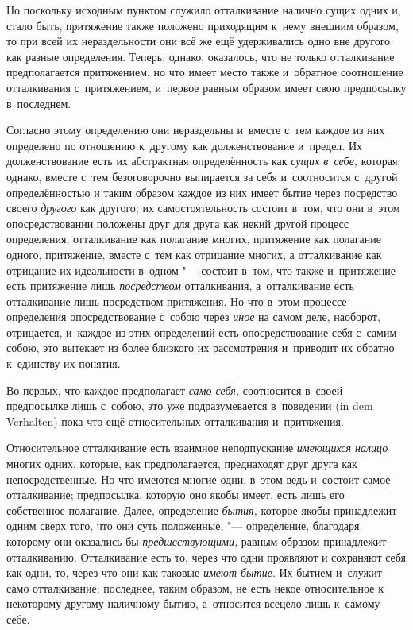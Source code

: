Но поскольку исходным пунктом служило отталкивание налично сущих одних и,
стало быть, притяжение также положено приходящим к~нему внешним образом, то
при всей их нераздельности они всё же ещё удерживались одно вне другого как
разные определения. Теперь, однако, оказалось, что не только отталкивание
предполагается притяжением, но что имеет место также и~обратное соотношение
отталкивания с~притяжением, и~первое равным образом имеет свою предпосылку
в~последнем.

Согласно этому определению они нераздельны и~вместе с~тем каждое из них
определено по отношению к~другому как долженствование и~предел. Их
долженствование есть их абстрактная определённость как
{\em сущих в~себе,} которая, однако, вместе с~тем
безоговорочно выпирается за себя и~соотносится с~другой определённостью и
таким образом каждое из них имеет бытие через посредство своего
{\em другого} как другого; их самостоятельность состоит
в~том, что они в~этом опосредствовании положены друг для друга как некий
другой процесс определения, отталкивание как полагание многих, притяжение
как полагание одного, притяжение, вместе с~тем как отрицание многих, а
отталкивание как отрицание их идеальности в~одном "--- состоит в~том, что
также и~притяжение есть притяжение лишь
{\em посредством} отталкивания, а~отталкивание есть
отталкивание лишь посредством притяжения. Но что в~этом процессе
определения опосредствование с~собою через {\em иное}
на самом деле, наоборот, отрицается, и~каждое из этих определений есть
опосредствование себя с~самим собою, это вытекает из более близкого их
рассмотрения и~приводит их обратно к~единству их понятия.

Во-первых, что каждое предполагает {\em само себя,} соотносится в~своей
предпосылке лишь с~собою, это уже подразумевается в~поведении
(in dem Verhalten) пока что ещё относительных отталкивания и~притяжения.

Относительное отталкивание есть взаимное неподпускание
{\em имеющихся налицо} многих одних, которые, как
предполагается, преднаходят друг друга как непосредственные. Но что имеются
многие одни, в~этом ведь и~состоит самое отталкивание; предпосылка, которую
оно якобы имеет, есть лишь его собственное полагание. Далее, определение
{\em бытия,} которое якобы принадлежит одним сверх
того, что они суть положенные, "--- определение, благодаря которому они
оказались бы {\em предшествующими,} равным образом
принадлежит отталкиванию. Отталкивание есть то, через что одни проявляют и
сохраняют себя как одни, то, через что они как таковые
{\em имеют бытие}. Их бытием и~служит само
отталкивание; последнее, таким образом, не есть некое относительное к
некоторому другому наличному бытию, а~относится всецело лишь к~самому себе.

